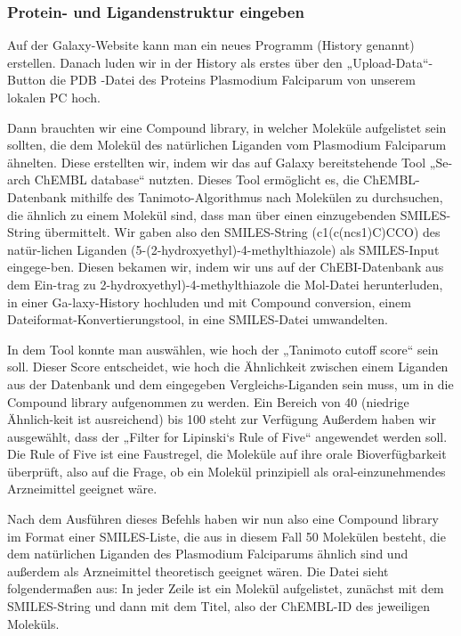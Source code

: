 \documentclass[11pt]{article}
\begin{document}
    \subsubsection{Protein- und Ligandenstruktur eingeben}\label{subsubsec:protein--und-ligandenstruktur-eingeben}

    Auf der Galaxy-Website kann man ein neues Programm (History genannt) erstellen.
    Danach luden wir in der History als erstes über den „Upload-Data“-Button die PDB -Datei des Proteins Plasmodium Falciparum von unserem lokalen PC hoch.

    Dann brauchten wir eine Compound library, in welcher Moleküle aufgelistet sein sollten, die dem Molekül des natürlichen Liganden vom Plasmodium Falciparum ähnelten.
    Diese erstellten wir, indem wir das auf Galaxy bereitstehende Tool „Se-arch ChEMBL database“ nutzten.
    Dieses Tool ermöglicht es, die ChEMBL-Datenbank mithilfe des Tanimoto-Algorithmus nach Molekülen zu durchsuchen, die ähnlich zu einem Molekül sind, dass man über einen einzugebenden SMILES-String übermittelt.
    Wir gaben also den SMILES-String (c1(c(ncs1)C)CCO) des natür-lichen Liganden (5-(2-hydroxyethyl)-4-methylthiazole) als SMILES-Input eingege-ben.
    Diesen bekamen wir, indem wir uns auf der ChEBI-Datenbank aus dem Ein-trag zu 2-hydroxyethyl)-4-methylthiazole die Mol-Datei herunterluden, in einer Ga-laxy-History hochluden und mit Compound conversion, einem Dateiformat-Konvertierungstool, in eine SMILES-Datei umwandelten.

    In dem Tool konnte man auswählen, wie hoch der „Tanimoto cutoff score“ sein soll.
    Dieser Score entscheidet, wie hoch die Ähnlichkeit zwischen einem Liganden aus der Datenbank und dem eingegeben Vergleichs-Liganden sein muss, um in die Compound library aufgenommen zu werden.
    Ein Bereich von 40 (niedrige Ähnlich-keit ist ausreichend) bis 100 steht zur Verfügung Außerdem haben wir ausgewählt, dass der „Filter for Lipinski‘s Rule of Five“ angewendet werden soll.
    Die Rule of Five ist eine Faustregel, die Moleküle auf ihre orale Bioverfügbarkeit überprüft, also auf die Frage, ob ein Molekül prinzipiell als oral-einzunehmendes Arzneimittel geeignet wäre.


    Nach dem Ausführen dieses Befehls haben wir nun also eine Compound library im Format einer SMILES-Liste, die aus in diesem Fall 50 Molekülen besteht, die dem natürlichen Liganden des Plasmodium Falciparums ähnlich sind und außerdem als Arzneimittel theoretisch geeignet wären.
    Die Datei sieht folgendermaßen aus: In jeder Zeile ist ein Molekül aufgelistet, zunächst mit dem SMILES-String und dann mit dem Titel, also der ChEMBL-ID des jeweiligen Moleküls.
\end{document}
